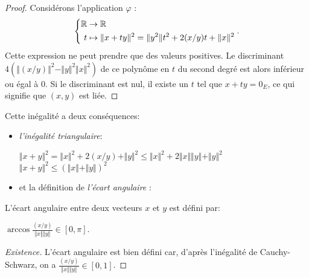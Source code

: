 \begin{proof}
Considérons l'application  $\varphi$ :
\begin{displaymath}
 \left\lbrace 
\begin{aligned}
 \mathbb{R} & \rightarrow  \mathbb{R} \\
 t & \mapsto   \Vert x + ty \Vert ^2 =  \Vert y^2 \Vert  t^2 + 2 (x/y) t +  \Vert  x  \Vert ^2
\end{aligned}
\right. .
\end{displaymath}
Cette expression ne peut prendre que des valeurs positives. Le discriminant $4(  \Vert (x/y) \Vert ^2 -  \Vert y \Vert ^2 \Vert x \Vert ^2 )$ de ce polynôme en $t$ du second degré est alors inférieur ou égal à 0.\newline
Si le discriminant est nul, il existe un $t$ tel que $x+ty = 0_E$, ce qui signifie que $(x,y)$ est liée.
\end{proof}
Cette inégalité a deux conséquences:
\begin{itemize} 
\item \emph{l'inégalité triangulaire}:
\begin{center}
$ \Vert  x + y \Vert ^2 =  \Vert x \Vert ^2 + 2(x/y) +  \Vert y \Vert ^2 \leq  \Vert x \Vert ^2 + 2  \Vert x \Vert   \Vert y \Vert  +  \Vert y \Vert ^2$ \\
$ \Vert x+y \Vert ^2 \leq ( \Vert x \Vert  +  \Vert y \Vert )^2$
\end{center}
\item et la définition de \emph{l'écart angulaire} :
\end{itemize}
\begin{defi}
L'écart angulaire entre deux vecteurs $x$ et $y$ est défini par:
\begin{center}
$\arccos \displaystyle \frac{ (x/y) }{  \Vert x \Vert   \Vert y \Vert  } \in [0, \pi]$.
\end{center}
\end{defi}
\begin{proof}[Existence]
L'écart angulaire est bien défini car, d'après l'inégalité de Cauchy-Schwarz, on a $\frac{ (x/y) }{  \Vert x \Vert   \Vert y \Vert  } \in [0,1]$.
\end{proof}
